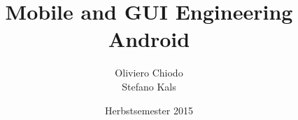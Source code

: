 \documentclass[a4paper,9pt]{extarticle}
\title{Mobile and GUI Engineering\\\large Android}
\author{Oliviero Chiodo\\ Stefano Kals}
\date{Herbstsemester 2015}
\affil{Hochschule für Technik Rapperswil}
\begin{document}
\maketitle
\clearpage
\raggedright
\footnotesize
\begin{multicols*}{3}

\setlength{\premulticols}{1pt}
\setlength{\postmulticols}{1pt}
\setlength{\multicolsep}{1pt}
\setlength{\columnsep}{2pt}






\end{multicols*}
\end{document}
